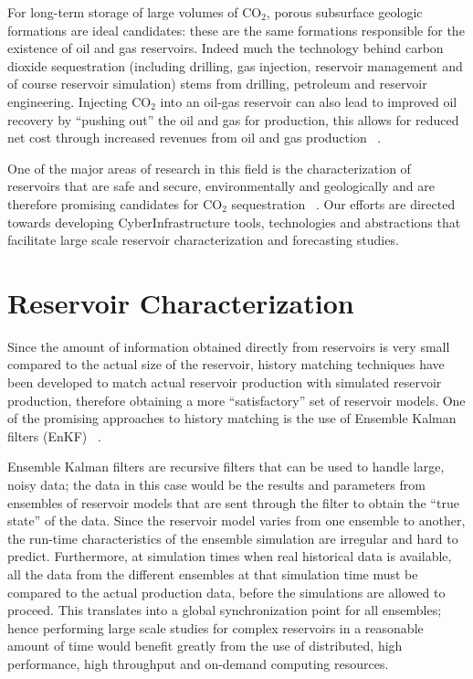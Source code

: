 \documentclass[10pt,conference,final]{IEEEtran}
\begin{document}
For long-term storage of large volumes of CO$_2$, porous subsurface geologic formations 
are ideal candidates: these are the same 
formations responsible for the existence of oil and gas reservoirs. Indeed much the 
technology behind carbon dioxide sequestration 
(including drilling, gas injection, reservoir management and of course reservoir 
simulation) stems from drilling, petroleum and 
reservoir engineering. Injecting CO$_2$ into an oil-gas reservoir can also lead to 
improved oil recovery by ``pushing out'' the 
oil and gas for production, this allows for reduced net cost through increased revenues 
from oil and gas production ~\cite{EORBook}.

One of the major areas of research in this field is the characterization of reservoirs 
that are safe and secure, environmentally 
and geologically and are therefore promising candidates for CO$_2$ sequestration 
~\cite{GeoRPT,Luigi}. Our efforts are directed 
towards developing CyberInfrastructure tools, technologies and abstractions that 
facilitate large scale reservoir characterization 
and forecasting studies.

\section*{Reservoir Characterization}

Since the amount of information obtained directly from reservoirs is very small compared 
to the actual size of the reservoir, 
history matching techniques have been developed to match actual reservoir production with 
simulated reservoir production, 
therefore obtaining a more ``satisfactory'' set of reservoir models. One of the promising approaches 
to history matching is the use of Ensemble Kalman filters (EnKF) ~\cite{KalmanPaper, 
DO2007, LiEnKF07, DO2006}.

Ensemble Kalman filters are recursive filters that can be used to handle large, noisy 
data; the data in this case would be the results and parameters from ensembles of 
reservoir models that are sent through the filter to obtain the ``true state'' of the 
data. Since the reservoir model varies from one ensemble to another, the run-time 
characteristics of the ensemble simulation are irregular and hard to predict. Furthermore, 
at simulation times when real historical data is available, all the data from the 
different ensembles at that simulation time must be compared to the actual production 
data, before the simulations are allowed to proceed. This translates into a global 
synchronization point for all ensembles; hence performing large scale studies for complex 
reservoirs in a reasonable amount of time would benefit greatly from the use of 
distributed, high performance, high throughput and on-demand computing resources.
\end{document}
